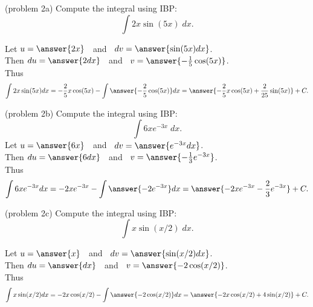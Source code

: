 \documentclass{ximera}
\begin{document}
\begin{problem}(problem 2a)
Compute the integral using IBP:
  \[
  \int 2x\sin(5x)\;dx.
  \]

Let $u = \answer{2x}\;\;$   and   $\;\;dv = \answer{\sin(5x) dx}$.\\
  Then $du = \answer{2 dx}\;\;$   and   $\;\; v = \answer{-\frac15 \cos(5x)}$.\\
  Thus 
  \[
  \int 2x\sin(5x) dx = -\frac25 x\cos(5x) - \int \answer{-\frac25 \cos(5x)} dx = \answer{-\frac25 x\cos(5x) +\frac{2}{25} \sin(5x)} + C.
  \]
  
\end{problem}


\begin{problem}(problem 2b)
Compute the integral using IBP:
  \[
  \int 6xe^{-3x} \;dx.
  \]
Let $u = \answer{6x}\;\;$   and   $\;\;dv = \answer{e^{-3x} dx}$.\\
  Then $du = \answer{6 dx}\;\;$   and   $\;\;v = \answer{-\frac13 e^{-3x}}$.\\
  Thus 
  \[
  \int 6xe^{-3x} dx = -2 xe^{-3x} -\int \answer{-2 e^{-3x}} dx = \answer{-2 xe^{-3x} - \frac23 e^{-3x}} + C.
  \]
  
\end{problem}


\begin{problem}(problem 2c)
Compute the integral using IBP:
  \[
  \int x\sin(x/2) \;dx.
  \]

Let $u = \answer{x}\;\;$   and   $\;\;dv = \answer{\sin(x/2) dx}$.\\
  Then $du = \answer{ dx}\;\;$   and   $\;\;v = \answer{-2 \cos(x/2)}$.\\
  Thus 
  \[
  \int x\sin(x/2) dx = -2x\cos(x/2) - \int \answer{-2 \cos(x/2)} dx = \answer{-2x\cos(x/2) + 4 \sin(x/2)} + C.
  \]
  
\end{problem}
\end{document}
